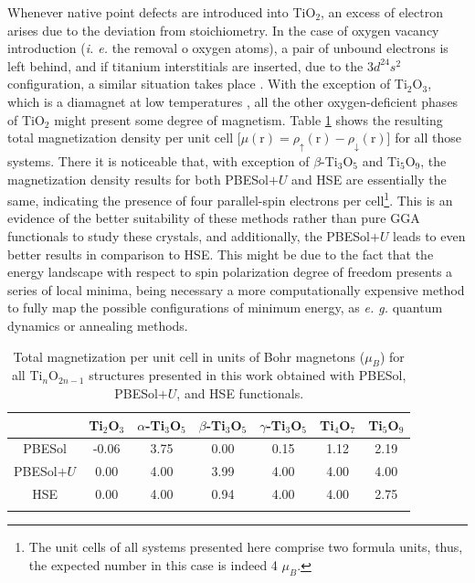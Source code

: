 Whenever native point defects are introduced into TiO$_2$, an excess of electron arises due to the deviation from stoichiometry. In the case of oxygen vacancy introduction (\textit{i. e.} the removal o oxygen atoms), a pair of unbound electrons is left behind, and if titanium interstitials are inserted, due to the $3d^24s^2$ configuration, a similar situation takes place \cite{Janotti2010,Lee2012}. With the exception of Ti$_2$O$_3$, which is a diamagnet at low temperatures \cite{Guo2012}, all the other oxygen-deficient phases of TiO$_2$ might present some degree of magnetism. Table \ref{tab:mags} shows the resulting total magnetization density per unit cell [$\mu(\mathrm{r})=\rho_{\uparrow}(\mathrm{r})-\rho_{\downarrow}(\mathrm{r})$] for all those systems. There it is noticeable that, with exception of $\beta$-Ti$_3$O$_5$ and Ti$_5$O$_9$, the magnetization density results for both PBESol$+U$ and HSE are essentially the same, indicating the presence of four parallel-spin electrons per cell\footnote{The unit cells of all systems presented here comprise two formula units, thus, the expected number in this case is indeed 4 $\mu_B$.}. This is an evidence of the better suitability of these methods rather than pure GGA functionals to study these crystals, and additionally, the PBESol$+U$ leads to even better results in comparison to HSE. This might be due to the fact that the energy landscape with respect to spin polarization degree of freedom presents a series of local minima, being necessary a more computationally expensive method to fully map the possible configurations of minimum energy, as \textit{e. g.} quantum dynamics or annealing methods.
\begin{table}[ht!]
  \centering
  \caption{\label{tab:mags} Total magnetization per unit cell in units of Bohr magnetons ($\mu_B$) for all Ti${}_n$O${}_{2n-1}$ structures presented in this work obtained with PBESol, PBESol$+U$, and HSE functionals.}
   \begin{tabular}{*{7}{c}}
  \hhline{=======} 
    & Ti${}_2$O${}_3$ & $\alpha$-Ti${}_3$O${}_5$ & $\beta$-Ti$_3$O$_5$ & $\gamma$-Ti$_3$O$_5$ & Ti${}_4$O${}_7$ & Ti${}_5$O${}_9$ \\
    \hline
   PBESol & -0.06  & 3.75   & 0.00    & 0.15    & 1.12       & 2.19                    \\
     PBESol$+U$ &  0.00    & 4.00   & 3.99     & 4.00   & 4.00       & 4.00           \\
  HSE &  0.00   & 4.00   & 0.94  & 4.00   & 4.00     & 2.75      \\ 
  \hhline{=======} 
   \end{tabular}
 \end{table}

